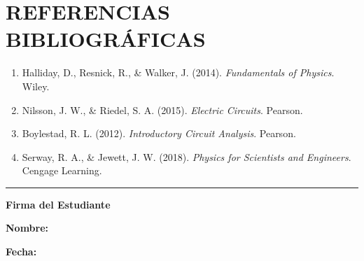 \documentclass[12pt]{article}
\begin{document}
\section*{REFERENCIAS BIBLIOGRÁFICAS}
\begin{enumerate}
    \item Halliday, D., Resnick, R., \& Walker, J. (2014). \textit{Fundamentals of Physics}. Wiley.
    \item Nilsson, J. W., \& Riedel, S. A. (2015). \textit{Electric Circuits}. Pearson.
    \item Boylestad, R. L. (2012). \textit{Introductory Circuit Analysis}. Pearson.
    \item Serway, R. A., \& Jewett, J. W. (2018). \textit{Physics for Scientists and Engineers}. Cengage Learning.
\end{enumerate}

\vspace{1cm}

\begin{center}
    \rule{0.8\textwidth}{0.5pt}
    
    \textbf{Firma del Estudiante}
    
    \vspace{0.5cm}
    
    \textbf{Nombre:} \underline{\hspace{8cm}}
    
    \vspace{0.5cm}
    
    \textbf{Fecha:} \underline{\hspace{8cm}}
\end{center}
\end{document}
